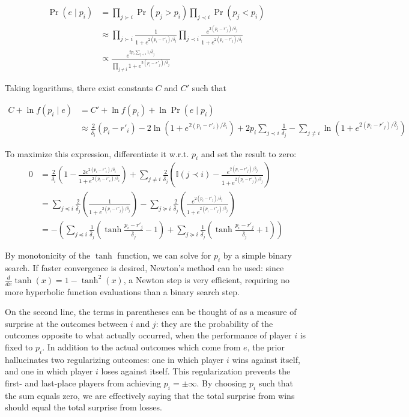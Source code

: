 \documentclass{article}
\begin{document}
\begin{align*}
\Pr(e\mid p_i)
&= \prod_{j \succ i} \Pr(p_j > p_i) \prod_{j \prec i} \Pr(p_j < p_i)
\\&\approx \prod_{j \succ i} \frac {1} {1 + e^{2(p_i-r'_j)/\bar\delta_j}} \prod_{j \prec i} \frac {e^{2(p_i-r'_j)/\bar\delta_j}} {1 + e^{2(p_i-r'_j)/\bar\delta_j}}
\\&\propto \frac {e^{2p_i\sum_{j\prec i}1/\bar\delta_j}} {\prod_{j\neq i} 1 + e^{2(p_i-r'_j)/\bar\delta_j}}
\end{align*}

Taking logarithms, there exist constants $C$ and $C'$ such that

\begin{align*}
C + \ln f(p_i\mid e)
&= C' + \ln f(p_i) + \ln \Pr(e\mid p_i)
\\&\approx \frac{2}{\bar\delta_i} (p_i-r'_i) - 2\ln\left(1 + e^{2(p_i-r'_i)/\bar\delta_i} \right) + 2p_i\sum_{j\prec i} \frac{1}{\bar\delta_j} - \sum_{j\neq i} \ln\left(1 + e^{2(p_i-r'_j)/\bar\delta_j}\right)
\end{align*}

To maximize this expression, differentiate it w.r.t. $p_i$ and set the result to zero:
\begin{align*}
0 &= \frac{2}{\bar\delta_i}\left(1 - \frac {2e^{2(p_i-r'_i)/\bar\delta_i}} {1 + e^{2(p_i-r'_i)/\bar\delta_i}} \right)
+ \sum_{j\neq i}\frac{2}{\bar\delta_j}\left(\mathbb{I}(j\prec i) - \frac {e^{2(p_i-r'_j)/\bar\delta_j}} {1 + e^{2(p_i-r'_j)/\bar\delta_j}} \right)
\\&= \sum_{j\preceq i}\frac{2}{\bar\delta_j}\left(\frac {1} {1 + e^{2(p_i-r'_j)/\bar\delta_j}} \right)
- \sum_{j\succeq i}\frac{2}{\bar\delta_j}\left(\frac {e^{2(p_i-r'_j)/\bar\delta_j}} {1 + e^{2(p_i-r'_j)/\bar\delta_j}} \right)
\\&= -\left( \sum_{j\preceq i}\frac{1}{\bar\delta_j}\left( \tanh\frac {p_i - r'_j} {\bar\delta_j} - 1 \right)
+ \sum_{j\succeq i}\frac{1}{\bar\delta_j}\left( \tanh\frac {p_i - r'_j} {\bar\delta_j} + 1 \right) \right)
\end{align*}

By monotonicity of the $\tanh$ function, we can solve for $p_i$ by a simple binary search. If faster convergence is desired, Newton's method can be used: since $\frac{d}{dx}\tanh(x) = 1 - \tanh^2(x)$, a Newton step is very efficient, requiring no more hyperbolic function evaluations than a binary search step.

On the second line, the terms in parentheses can be thought of as a measure of surprise at the outcomes between $i$ and $j$: they are the probability of the outcomes opposite to what actually occurred, when the performance of player $i$ is fixed to $p_i$. In addition to the actual outcomes which come from $e$, the prior hallucinates two regularizing outcomes: one in which player $i$ wins against itself, and one in which player $i$ loses against itself. This regularization prevents the first- and last-place players from achieving $p_i = \pm\infty$. By choosing $p_i$ such that the sum equals zero, we are effectively saying that the total surprise from wins should equal the total surprise from losses.
\end{document}
